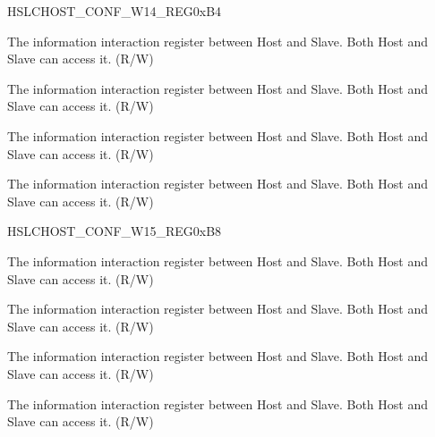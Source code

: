 \begin{register}{H}{SLCHOST\_CONF\_W14\_REG}{0xB4}\label{regdesc:SLCHOSTCONFW14REG}
%
%
%
%
\regnewline%
\begin{regdesc}\begin{reglist}
\item [SLCHOST\_CONF59]The information interaction register between Host and Slave. Both Host and Slave can access it. (R/W)
\item [SLCHOST\_CONF58]The information interaction register between Host and Slave. Both Host and Slave can access it. (R/W)
\item [SLCHOST\_CONF57]The information interaction register between Host and Slave. Both Host and Slave can access it. (R/W)
\item [SLCHOST\_CONF56]The information interaction register between Host and Slave. Both Host and Slave can access it. (R/W)
\end{reglist}\end{regdesc}
\end{register}


\begin{register}{H}{SLCHOST\_CONF\_W15\_REG}{0xB8}\label{regdesc:SLCHOSTCONFW15REG}
%
%
%
%
\regnewline%
\begin{regdesc}\begin{reglist}
\item [SLCHOST\_CONF63]The information interaction register between Host and Slave. Both Host and Slave can access it. (R/W)
\item [SLCHOST\_CONF62]The information interaction register between Host and Slave. Both Host and Slave can access it. (R/W)
\item [SLCHOST\_CONF61]The information interaction register between Host and Slave. Both Host and Slave can access it. (R/W)
\item [SLCHOST\_CONF60]The information interaction register between Host and Slave. Both Host and Slave can access it. (R/W)
\end{reglist}\end{regdesc}
\end{register}


